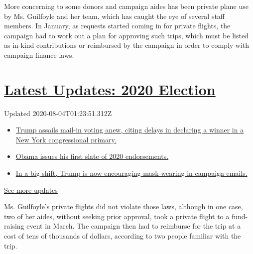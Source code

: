 More concerning to some donors and campaign aides has been private plane
use by Ms. Guilfoyle and her team, which has caught the eye of several
staff members. In January, as requests started coming in for private
flights, the campaign had to work out a plan for approving such trips,
which must be listed as in-kind contributions or reimbursed by the
campaign in order to comply with campaign finance laws.

\hypertarget{latest-updates-2020-election}{%
\section{\texorpdfstring{\href{https://www.nytimes3xbfgragh.onion/2020/08/03/us/elections/biden-vs-trump.html?action=click\&pgtype=Article\&state=default\&region=MAIN_CONTENT_1\&context=storylines_live_updates}{Latest
Updates: 2020
Election}}{Latest Updates: 2020 Election}}\label{latest-updates-2020-election}}

Updated 2020-08-04T01:23:51.312Z

\begin{itemize}
\tightlist
\item
  \href{https://www.nytimes3xbfgragh.onion/2020/08/03/us/elections/biden-vs-trump.html?action=click\&pgtype=Article\&state=default\&region=MAIN_CONTENT_1\&context=storylines_live_updates\#link-6494b448}{Trump
  assails mail-in voting anew, citing delays in declaring a winner in a
  New York congressional primary.}
\item
  \href{https://www.nytimes3xbfgragh.onion/2020/08/03/us/elections/biden-vs-trump.html?action=click\&pgtype=Article\&state=default\&region=MAIN_CONTENT_1\&context=storylines_live_updates\#link-3de249e6}{Obama
  issues his first slate of 2020 endorsements.}
\item
  \href{https://www.nytimes3xbfgragh.onion/2020/08/03/us/elections/biden-vs-trump.html?action=click\&pgtype=Article\&state=default\&region=MAIN_CONTENT_1\&context=storylines_live_updates\#link-54e34d20}{In
  a big shift, Trump is now encouraging mask-wearing in campaign
  emails.}
\end{itemize}

\href{https://www.nytimes3xbfgragh.onion/2020/08/03/us/elections/biden-vs-trump.html?action=click\&pgtype=Article\&state=default\&region=MAIN_CONTENT_1\&context=storylines_live_updates}{See
more updates}

Ms. Guilfoyle's private flights did not violate those laws, although in
one case, two of her aides, without seeking prior approval, took a
private flight to a fund-raising event in March. The campaign then had
to reimburse for the trip at a cost of tens of thousands of dollars,
according to two people familiar with the trip.

